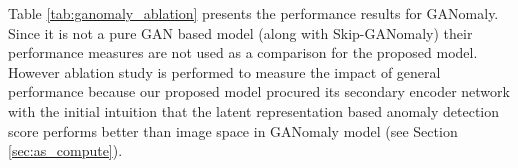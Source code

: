 Table \ref{tab:ganomaly_ablation} presents the performance results for GANomaly. Since it is not a
pure GAN based model (along with Skip-GANomaly) their performance measures are not used as a
comparison for the proposed model. However ablation study is performed to measure the impact of
general performance because our proposed model procured its secondary encoder network with the
initial intuition that the latent representation based anomaly detection score performs better than
image space in GANomaly model (see Section \ref{sec:as_compute}). 

\begin{table}[!h]
	\centering
	\caption{Ablation study for GANomaly to test the effect of various training improvements for stabilization. }
	\label{tab:ganomaly_ablation}
\end{table}


